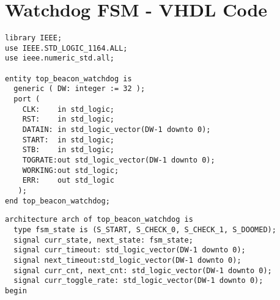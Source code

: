 \chapter{Watchdog FSM - VHDL Code}
\label{sec:watchdog_fsm}

\begin{lstlisting}[style=vhdl, caption={Watchdog FSM - VHDL Code (Entity)}]
library IEEE;
use IEEE.STD_LOGIC_1164.ALL;
use ieee.numeric_std.all;

entity top_beacon_watchdog is
  generic ( DW: integer := 32 );
  port (
    CLK:    in std_logic;
    RST:    in std_logic;
    DATAIN: in std_logic_vector(DW-1 downto 0);
    START:  in std_logic;
    STB:    in std_logic;
    TOGRATE:out std_logic_vector(DW-1 downto 0);
    WORKING:out std_logic;
    ERR:    out std_logic
   );
end top_beacon_watchdog;
\end{lstlisting}


\begin{lstlisting}[style=vhdl, caption={Watchdog FSM - VHDL Code (Architecture Header)}]
architecture arch of top_beacon_watchdog is
  type fsm_state is (S_START, S_CHECK_0, S_CHECK_1, S_DOOMED);
  signal curr_state, next_state: fsm_state;
  signal curr_timeout: std_logic_vector(DW-1 downto 0);
  signal next_timeout:std_logic_vector(DW-1 downto 0);
  signal curr_cnt, next_cnt: std_logic_vector(DW-1 downto 0);
  signal curr_toggle_rate: std_logic_vector(DW-1 downto 0);
begin
\end{lstlisting}

